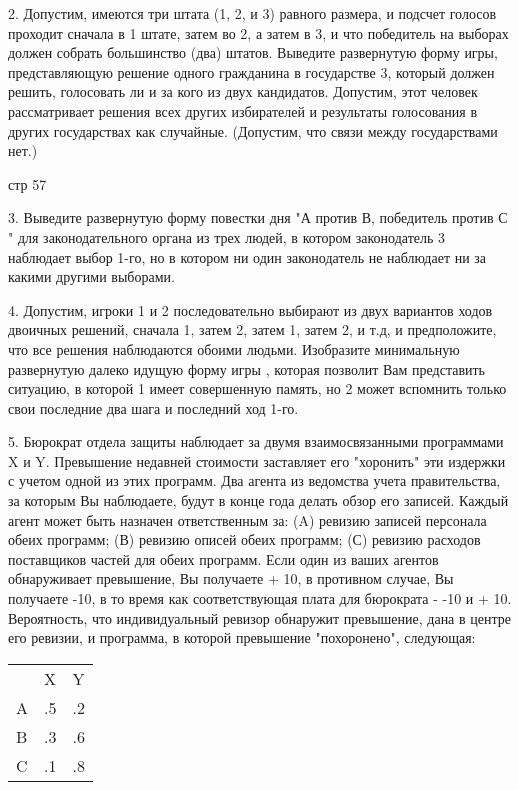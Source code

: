 \documentclass[a4paper,12pt]{article}
\begin{document}
2. Допустим, имеются три штата (1, 2, и 3) равного
размера, и подсчет голосов проходит сначала в 1
штате, затем во 2, а затем в 3, и что победитель на
выборах должен собрать большинство (два) штатов.
Выведите развернутую форму игры, представляющую
решение одного гражданина в государстве 3, который
должен решить, голосовать ли и за кого из двух
кандидатов. Допустим, этот человек рассматривает
решения всех других избирателей и результаты
голосования в других государствах как случайные.
(Допустим, что связи между государствами нет.)

\bigskip стр 57

3. Выведите развернутую форму повестки дня "А
против В, победитель против С " для
законодательного органа из трех людей, в котором
законодатель 3 наблюдает выбор 1-го, но в котором
ни один законодатель не наблюдает ни за какими
другими выборами.

4. Допустим, игроки 1 и 2 последовательно выбирают
из двух вариантов ходов двоичных решений, сначала
1, затем 2, затем 1, затем 2, и т.д, и
предположите, что все решения наблюдаются обоими
людьми. Изобразите минимальную развернутую далеко
идущую форму игры , которая позволит Вам
представить ситуацию, в которой 1 имеет совершенную
память, но 2 может вспомнить только свои последние
два шага и последний ход 1-го.

5. Бюрократ отдела защиты наблюдает за двумя
взаимосвязанными программами X и Y. Превышение
недавней стоимости заставляет его "хоронить" эти
издержки с учетом одной из этих программ. Два
агента из ведомства учета правительства, за которым
Вы наблюдаете, будут в конце года делать обзор его
записей. Каждый агент может быть назначен
ответственным за: (A) ревизию записей персонала
обеих программ; (В) ревизию описей обеих программ;
(С) ревизию расходов поставщиков частей для обеих
программ. Если один из ваших агентов обнаруживает
превышение, Вы получаете + 10, в противном случае,
Вы получаете -10, в то время как соответствующая
плата для бюрократа - -10 и + 10. Вероятность, что
индивидуальный ревизор обнаружит превышение, дана в
центре его ревизии, и программа, в которой
превышение "похоронено", следующая:

\bigskip

\begin{tabular}{lll}
& X & Y \\ \cline{2-3} A & \multicolumn{1}{|l}{.5}
& \multicolumn{1}{|l|}{.2} \\ \cline{2-3} B &
\multicolumn{1}{|l}{.3} & \multicolumn{1}{|l|}{.6}
\\ \cline{2-3} C & \multicolumn{1}{|l}{.1} &
\multicolumn{1}{|l|}{.8} \\ \cline{2-3}
\end{tabular}
\ \
\end{document}
